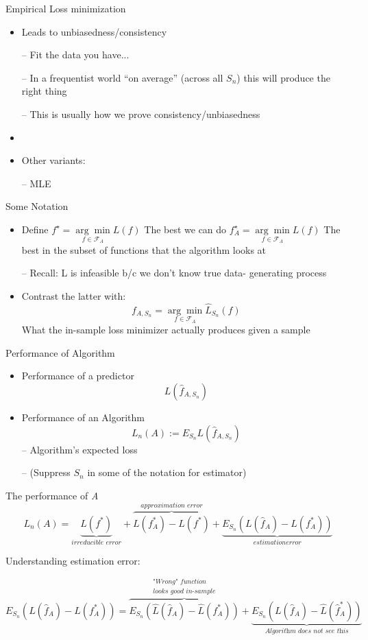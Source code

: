 \documentclass{beamer}
\begin{document}
\begin{frame}{Empirical Loss minimization}
	\begin{itemize}
		\item Leads to unbiasedness/consistency
		
		– Fit the data you have...
		
		– In a frequentist world “on average” (across all $S_{n}$) this will produce the right thing
		
		– This is usually how we prove consistency/unbiasedness
		\item[]
		\item Other variants: 
		
		– MLE
	\end{itemize}
\end{frame}

\begin{frame}{Some Notation}
	\begin{itemize}
		\item Define 
		$f^{\star}=\underset{f \in \mathcal{F}_A}{\arg\min}L(f)$ The best we can do
		$f^{\star}_A=\underset{f \in \mathcal{F}_A}{\arg\min}L(f)$ The best in the subset of functions that the algorithm looks at
		
		– Recall: L is infeasible b/c we don’t know true data- generating process
		
		\item Contrast the latter with:
		$$f_{A,S_n}=\underset{f \in \mathcal{F}_A}{\arg\min}\hat{L}_{S_n}(f)$$
		What the in-sample loss minimizer actually produces given a sample
	\end{itemize}
\end{frame}

\begin{frame}{Performance of Algorithm}
	\begin{itemize}
		\item Performance of a predictor
		$$L(\hat{f}_{A,S_n})$$	
		\item Performance of an Algorithm
		$$L_n(A) := E_{S_n}L(\hat{f}_{A,S_n})$$
		– Algorithm’s expected loss
		
		– (Suppress $S_n$ in some of the notation for estimator)
	\end{itemize}
\end{frame}

\begin{frame}{The performance of \textit{A}}
		$$L_n(A)=\underbrace{L(f^\ast)}_{\textit{irreducible error}}+\overbrace{L(f^\ast_A)-L(f^\ast)}^{\textit{approximation error}}+\boxed{\underbrace{E_{S_n}(L(\hat{f}_A)-L(f^\ast_A))}_{\textit{estimationerror}}}$$
		
		Understanding estimation error:
		
		$$E_{S_n}(L(\hat{f}_A)-L(f^\ast_A))=\overbrace{E_{S_n}(\hat{L}(\hat{f}_A)-\hat{L}(f^\ast_A))}^{\substack{\textit{"Wrong" function}\\ \textit{looks good in-sample}}}+\boxed{\underbrace{E_{S_n}(L(\hat{f}_A)-\hat{L}(\hat{f}^\ast_A))}_{\textit{Algorithm does not see this}}}$$
		
\end{frame}
\end{document}
